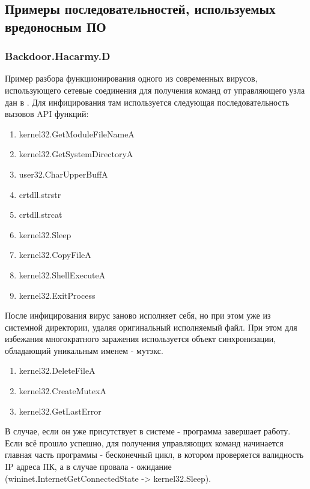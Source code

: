 \subsection {Примеры последовательностей, используемых вредоносным ПО}
\subsubsection {Backdoor.Hacarmy.D}
Пример разбора функционирования одного из современных вирусов, использующего сетевые соединения для
получения команд от управляющего узла дан в \cite{REVERSING}. Для инфицирования там используется следующая последовательность вызовов API функций:
\begin {enumerate}
	\item kernel32.GetModuleFileNameA
	\item kernel32.GetSystemDirectoryA
	\item user32.CharUpperBuffA
	\item crtdll.strstr
	\item crtdll.strcat
	\item kernel32.Sleep
	\item kernel32.CopyFileA
	\item kernel32.ShellExecuteA
	\item kernel32.ExitProcess
\end {enumerate}
После инфицирования вирус заново исполняет себя, но при этом уже из системной директории, удаляя оригинальный
исполняемый файл. При этом для избежания многократного заражения используется объект синхронизации, обладающий уникальным именем - мутэкс.
\begin {enumerate}
	\item kernel32.DeleteFileA
	\item kernel32.CreateMutexA
	\item kernel32.GetLastError
\end {enumerate}
В случае, если он уже присутствует в системе - программа завершает работу. Если всё прошло успешно, для получения управляющих команд начинается главная часть программы - бесконечный цикл, в котором проверяется валидность IP адреса ПК, а в случае провала - ожидание (wininet.InternetGetConnectedState -> kernel32.Sleep).
